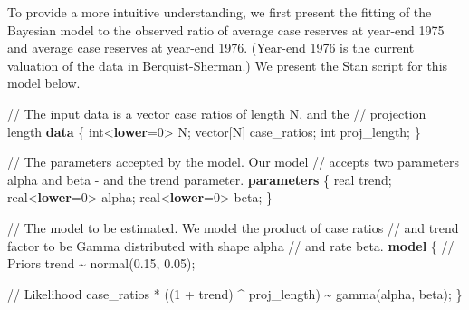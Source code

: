 \documentclass[
  letterpaper,
  DIV=11,
  numbers=noendperiod]{scrartcl}
\newenvironment{Shaded}{\begin{snugshade}}{\end{snugshade}}
\newcommand{\CommentTok}[1]{\textcolor[rgb]{0.37,0.37,0.37}{#1}}
\newcommand{\DataTypeTok}[1]{\textcolor[rgb]{0.68,0.00,0.00}{#1}}
\newcommand{\DecValTok}[1]{\textcolor[rgb]{0.68,0.00,0.00}{#1}}
\newcommand{\FloatTok}[1]{\textcolor[rgb]{0.68,0.00,0.00}{#1}}
\newcommand{\KeywordTok}[1]{\textcolor[rgb]{0.00,0.23,0.31}{\textbf{#1}}}
\newcommand{\NormalTok}[1]{\textcolor[rgb]{0.00,0.23,0.31}{#1}}
\begin{document}
To provide a more intuitive understanding, we first present the fitting
of the Bayesian model to the observed ratio of average case reserves at
year-end 1975 and average case reserves at year-end 1976. (Year-end 1976
is the current valuation of the data in Berquist-Sherman.) We present
the Stan script for this model below.

\begin{Shaded}
\begin{Highlighting}[]
\CommentTok{// The input data is a vector \textquotesingle{}case ratios\textquotesingle{} of length \textquotesingle{}N\textquotesingle{}, and the }
\CommentTok{// projection length}
\KeywordTok{data}\NormalTok{ \{}
  \DataTypeTok{int}\NormalTok{\textless{}}\KeywordTok{lower}\NormalTok{=}\DecValTok{0}\NormalTok{\textgreater{} N;}
  \DataTypeTok{vector}\NormalTok{[N] case\_ratios;}
  \DataTypeTok{int}\NormalTok{ proj\_length;}
\NormalTok{\}}

\CommentTok{// The parameters accepted by the model. Our model}
\CommentTok{// accepts two parameters \textquotesingle{}alpha\textquotesingle{} and \textquotesingle{}beta\textquotesingle{} {-} and the trend parameter.}
\KeywordTok{parameters}\NormalTok{ \{}
  \DataTypeTok{real}\NormalTok{ trend;}
  \DataTypeTok{real}\NormalTok{\textless{}}\KeywordTok{lower}\NormalTok{=}\DecValTok{0}\NormalTok{\textgreater{} alpha;}
  \DataTypeTok{real}\NormalTok{\textless{}}\KeywordTok{lower}\NormalTok{=}\DecValTok{0}\NormalTok{\textgreater{} beta;}
\NormalTok{\}}

\CommentTok{// The model to be estimated. We model the product of case ratios}
\CommentTok{// and trend factor to be Gamma distributed with shape \textquotesingle{}alpha\textquotesingle{}}
\CommentTok{// and rate \textquotesingle{}beta\textquotesingle{}.}
\KeywordTok{model}\NormalTok{ \{}
  \CommentTok{// Priors}
\NormalTok{  trend \textasciitilde{} normal(}\FloatTok{0.15}\NormalTok{, }\FloatTok{0.05}\NormalTok{);}
  
  \CommentTok{// Likelihood}
\NormalTok{  case\_ratios *  ((}\DecValTok{1}\NormalTok{ + trend) \^{} proj\_length)  \textasciitilde{} gamma(alpha, beta);}
\NormalTok{\}}
\end{Highlighting}
\end{Shaded}
\end{document}
